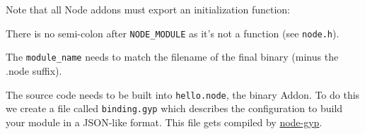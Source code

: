 \begin{Shaded}
\begin{Highlighting}[]
\NormalTok{>}
\NormalTok{>}


 
   \NormalTok{(}\NormalTok{));}
\NormalTok{\}}

 
  \NormalTok{),}
\NormalTok{\}}
\end{Highlighting}
\end{Shaded}

Note that all Node addons must export an initialization function:

\begin{Shaded}
\begin{Highlighting}[]
 
\end{Highlighting}
\end{Shaded}

There is no semi-colon after \texttt{NODE\_MODULE} as it's not a
function (see \texttt{node.h}).

The \texttt{module\_name} needs to match the filename of the final
binary (minus the .node suffix).

The source code needs to be built into \texttt{hello.node}, the binary
Addon. To do this we create a file called \texttt{binding.gyp} which
describes the configuration to build your module in a JSON-like format.
This file gets compiled by
\href{https://github.com/TooTallNate/node-gyp}{node-gyp}.

\begin{Shaded}
\begin{Highlighting}[]
\NormalTok{\{}
  \NormalTok{: [}
    \NormalTok{\{}
      \NormalTok{: }\NormalTok{,}
      \NormalTok{: [ } \NormalTok{]}
    \NormalTok{\}}
  \NormalTok{]}
\NormalTok{\}}
\end{Highlighting}
\end{Shaded}

